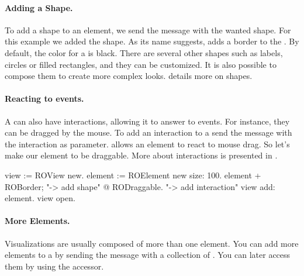 \documentclass[a4paper,10pt,twoside]{book}
\begin{document}
\paragraph{Adding a Shape.}
To add a shape to an element, we send the \ct{+} message with the wanted shape. For this example we added the  shape. As its name suggests,  adds a border to the . By default, the color for a  is black. There are several other shapes such as labels, circles or filled rectangles, and they can be customized. It is also possible to compose them to create more complex looks.  details more on shapes.

\paragraph{Reacting to events.}
A  can also have interactions, allowing it to answer to events. For instance, they can be dragged by the mouse. To add an interaction to a  send the  message with the interaction as parameter.  allows an element to react to mouse drag. So let's make our element to be draggable. More about interactions is presented in .

\begin{code}{}
view := ROView new.
element := ROElement new size: 100.
element 
	+ ROBorder; "-> add shape"
	@ RODraggable. "-> add interaction"
view add: element.
view open.
\end{code}


\paragraph{More Elements.}
Visualizations are usually composed of more than one element. You can add more elements to a  by sending the message  with a collection of . You can later access them by using the  accessor. 
\end{document}
